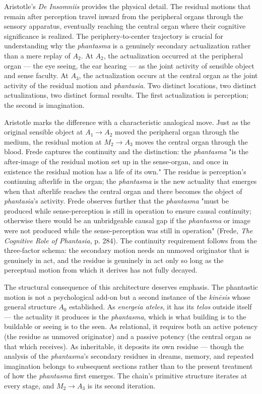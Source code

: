 \documentclass[12pt]{article}
\begin{document}
Aristotle's \textit{De Insomniis} provides the physical detail. The residual motions that remain after perception travel inward from the peripheral organs through the sensory apparatus, eventually reaching the central organ where their cognitive significance is realized. The periphery-to-center trajectory is crucial for understanding why the \textit{phantasma} is a genuinely secondary actualization rather than a mere replay of $A_2$. At $A_2$, the actualization occurred at the peripheral organ --- the eye seeing, the ear hearing --- as the joint activity of sensible object and sense faculty. At $A_3$, the actualization occurs at the central organ as the joint activity of the residual motion and \textit{phantasia}. Two distinct locations, two distinct actualizations, two distinct formal results. The first actualization is perception; the second is imagination.

Aristotle marks the difference with a characteristic analogical move. Just as the original sensible object at $A_1$$\to$$A_2$ moved the peripheral organ through the medium, the residual motion at $M_2$$\to$$A_3$ moves the central organ through the blood. Frede captures the continuity and the distinction: the \textit{phantasma} "is the after-image of the residual motion set up in the sense-organ, and once in existence the residual motion has a life of its own." The residue is perception's continuing afterlife in the organ; the \textit{phantasma} is the new actuality that emerges when that afterlife reaches the central organ and there becomes the object of \textit{phantasia}'s activity. Frede observes further that the \textit{phantasma} "must be produced while sense-perception is still in operation to ensure causal continuity; otherwise there would be an unbridgeable causal gap if the \textit{phantasma} or image were not produced while the sense-perception was still in operation" (Frede, \textit{The Cognitive Role of Phantasia}, p. 284). The continuity requirement follows from the three-factor schema: the secondary motion needs an unmoved originator that is genuinely in act, and the residue is genuinely in act only so long as the perceptual motion from which it derives has not fully decayed.

The structural consequence of this architecture deserves emphasis. The phantastic motion is not a psychological add-on but a second instance of the \textit{kinēsis} whose general structure $A_0$ established. As \textit{energeia ateles}, it has its \textit{telos} outside itself --- the actuality it produces is the \textit{phantasma}, which is what building is to the buildable or seeing is to the seen. As relational, it requires both an active potency (the residue as unmoved originator) and a passive potency (the central organ as that which receives). As inheritable, it deposits its own residue --- though the analysis of the \textit{phantasma}'s secondary residues in dreams, memory, and repeated imagination belongs to subsequent sections rather than to the present treatment of how the \textit{phantasma} first emerges. The chain's primitive structure iterates at every stage, and $M_2$$\to$$A_3$ is its second iteration.
\end{document}
